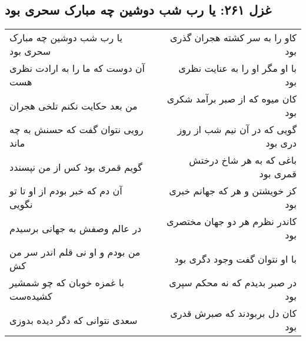 \begin{center}
\section*{غزل ۲۶۱: یا رب شب دوشین چه مبارک سحری بود}
\label{sec:261}
\begin{longtable}{l p{0.5cm} r}
یا رب شب دوشین چه مبارک سحری بود
&&
کاو را به سر کشته هجران گذری بود
\\
آن دوست که ما را به ارادت نظری هست
&&
با او مگر او را به عنایت نظری بود
\\
من بعد حکایت نکنم تلخی هجران
&&
کان میوه که از صبر برآمد شکری بود
\\
رویی نتوان گفت که حسنش به چه ماند
&&
گویی که در آن نیم شب از روز دری بود
\\
گویم قمری بود کس از من نپسندد
&&
باغی که به هر شاخ درختش قمری بود
\\
آن دم که خبر بودم از او تا تو نگویی
&&
کز خویشتن و هر که جهانم خبری بود
\\
در عالم وصفش به جهانی برسیدم
&&
کاندر نظرم هر دو جهان مختصری بود
\\
من بودم و او نی قلم اندر سر من کش
&&
با او نتوان گفت وجود دگری بود
\\
با غمزه خوبان که چو شمشیر کشیده‌ست
&&
در صبر بدیدم که نه محکم سپری بود
\\
سعدی نتوانی که دگر دیده بدوزی
&&
کان دل بربودند که صبرش قدری بود
\\
\end{longtable}
\end{center}
